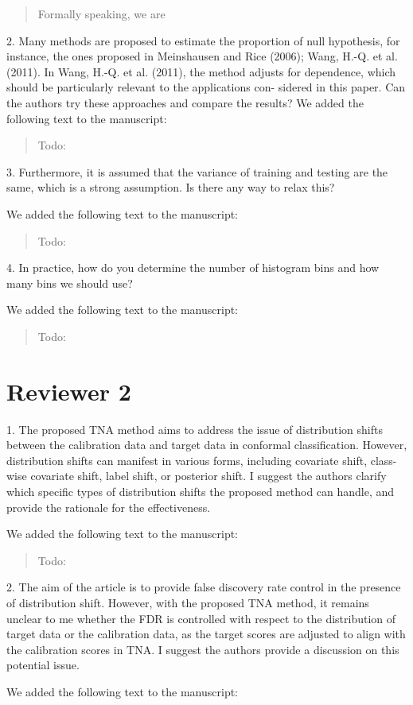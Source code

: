 \documentclass{article}
\newcommand{\response}[1]{\vspace*{1ex} \color{blue} \noindent #1 \color{black}
\vspace*{2ex}}
\newcommand{\edit}[1]{\begin{quotation}\color{red}\noindent #1
\color{black}\end{quotation}}
\begin{document}
\edit{Formally speaking, we are }

2. Many methods are proposed to estimate the proportion of null hypothesis, for instance, the ones proposed in Meinshausen and Rice (2006); Wang, H.-Q. et al. (2011). In Wang, H.-Q. et al. (2011), the method adjusts for dependence, which should be particularly relevant to the applications con- sidered in this paper. Can the authors try these approaches and compare the results?
\response{We added the following text to the manuscript:}

\edit{Todo:}

3. Furthermore, it is assumed that the variance of training and testing are the same, which is a strong assumption. Is there any way to relax this?


\response{We added the following text to the manuscript:}

\edit{Todo:}

4. In practice, how do you determine the number of histogram bins and how many bins we should use?

\response{We added the following text to the manuscript:}

\edit{Todo:}



\clearpage
\section*{Reviewer 2}
1. The proposed TNA method aims to address the issue of distribution shifts between the calibration data and target data in conformal classification.
However, distribution shifts can manifest in various forms, including covariate shift, class-wise covariate shift, label shift, or posterior shift.
I suggest the authors clarify which specific types of distribution shifts the proposed method can handle, and provide the rationale for the effectiveness.

\response{We added the following text to the manuscript:}

\edit{Todo:}

2. The aim of the article is to provide false discovery rate control in the presence of distribution shift.
However, with the proposed TNA method, it remains unclear to me whether the FDR is controlled with respect to the distribution of target data or the calibration data, as the target scores are adjusted to align with the calibration scores in TNA.
I suggest the authors provide a discussion on this potential issue.

\response{We added the following text to the manuscript:}
\end{document}
